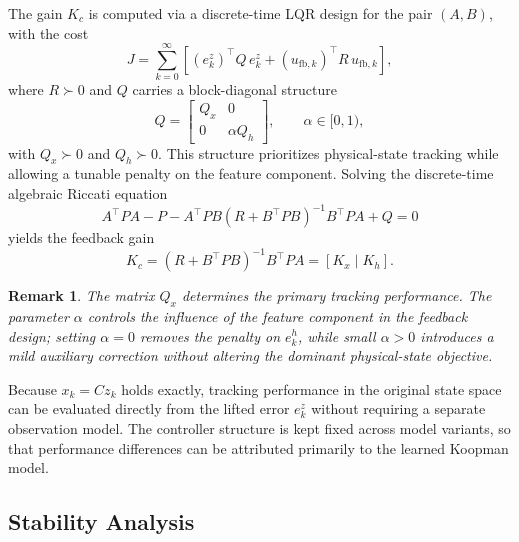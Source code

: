 \documentclass[journal]{IEEEtran}
\newtheorem{remark}{Remark}
\begin{document}
The gain $K_c$ is computed via a discrete-time LQR design for the pair $(A,B)$, with the cost
\begin{equation}
    J = \sum_{k=0}^{\infty}
    \left[(e_k^z)^\top Q\, e_k^z + (u_{\mathrm{fb},k})^\top R\,u_{\mathrm{fb},k}\right],
    \label{eq:lqr_objective}
\end{equation}
where $R \succ 0$ and $Q$ carries a block-diagonal structure
\begin{equation}
    Q = \begin{bmatrix} Q_x & 0 \\ 0 & \alpha Q_h \end{bmatrix},
    \qquad \alpha \in [0,1),
    \label{eq:block_diag_Q}
\end{equation}
with $Q_x \succ 0$ and $Q_h \succ 0$. This structure prioritizes physical-state tracking while allowing a tunable penalty on the feature component. Solving the discrete-time algebraic Riccati equation
\begin{equation}
    A^\top P A - P - A^\top P B(R + B^\top P B)^{-1}B^\top P A + Q = 0
    \label{eq:dare}
\end{equation}
yields the feedback gain
\begin{equation}
    K_c = (R + B^\top P B)^{-1}B^\top P A = [K_x\;|\;K_h].
    \label{eq:lqr_gain}
\end{equation}

\begin{remark}
The matrix $Q_x$ determines the primary tracking performance. The parameter $\alpha$ controls the influence of the feature component in the feedback design; setting $\alpha = 0$ removes the penalty on $e_k^h$, while small $\alpha > 0$ introduces a mild auxiliary correction without altering the dominant physical-state objective.
\end{remark}

Because $x_k = C z_k$ holds exactly, tracking performance in the original state space can be evaluated directly from the lifted error $e_k^z$ without requiring a separate observation model. The controller structure is kept fixed across model variants, so that performance differences can be attributed primarily to the learned Koopman model.

\subsection{Stability Analysis}
\label{subsec:stability}
\end{document}
